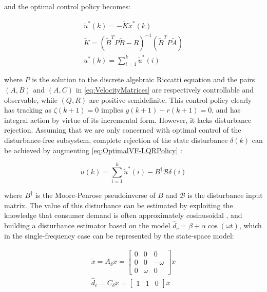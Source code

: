and the optimal control policy becomes:

\begin{equation}\label{eq:OptimalVF-LQRPolicy}
\begin{gathered}
\tilde{u}^*(k)  = -\tilde{K}\tilde{x}^*(k) \\
\tilde{K} = (\tilde{B}^TP\tilde{B}-R)^{-1}(\tilde{B}^TP\tilde{A}) \\
u^*(k) = \sum_{i=1}^{k} \tilde{u}^*(i)
\end{gathered}
\end{equation}

where $P$ is the solution to the discrete algebraic Riccatti equation and the pairs $(A,B)$ and $(A,C)$ in \cref{eq:VelocityMatrices} are respectively controllable and observable, while $(Q,R)$ are positive semidefinite. This control policy clearly has tracking as $\zeta(k+1) = 0$ implies $y(k+1)-r(k+1) = 0$, and has integral action by virtue of its incremental form. However, it lacks disturbance rejection. Assuming that we are only concerned with optimal control of the disturbance-free subsystem, complete rejection of the state disturbance $\delta(k)$ can be achieved by augmenting \cref{eq:OptimalVF-LQRPolicy} \cite{Singh2017}:

\begin{equation}
	u(k) = \sum_{i=1}^{k} \tilde{u}^*(i) - B^\dagger \mathcal{B}\delta(i)
\end{equation}

where $B^\dagger$ is the Moore-Penrose pseudoinverse of $B$ and $\mathcal{B}$ is the disturbance input matrix. The value of this disturbance can be estimated by exploiting the knowledge that consumer demand is often approximately cosinusoidal \cite{Anele2017}, and building a disturbance estimator based on the model $\hat{d}_c = \beta + \alpha\cos(\omega t)$, which in the single-frequency case can be represented by the state-space model:

\begin{equation}\label{eq:TheisticDisturbanceEstimator}
	\begin{gathered}
		\dot{x} = A_\delta x =  \begin{bmatrix}0 & 0 & 0 \\ 0 & 0 & -\omega \\ 0 & \omega & 0	\end{bmatrix}x \\
		\hat{d}_c = C_\delta x = \begin{bmatrix} 1 & 1 & 0 \end{bmatrix} x
	\end{gathered}
\end{equation}

